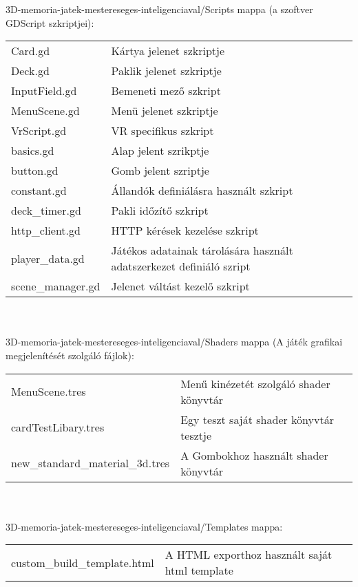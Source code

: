 \newpage

\noindent 3D-memoria-jatek-mestereseges-inteligenciaval/Scripts mappa (a szoftver GDScript szkriptjei):\\
\begin{tabular}{l l}
    \quad Card.gd  & \quad Kártya jelenet szkriptje \\ 
    \quad Deck.gd  & \quad Paklik jelenet szkriptje \\ 
    \quad InputField.gd  & \quad Bemeneti mező szkript \\ 
    \quad MenuScene.gd  & \quad Menü jelenet szkriptje \\ 
    \quad VrScript.gd  & \quad VR specifikus szkript \\ 
    \quad basics.gd  & \quad Alap jelent szrikptje \\ 
    \quad button.gd  & \quad Gomb jelent szriptje \\ 
    \quad constant.gd  & \quad Állandók definiálásra használt szkript \\ 
    \quad deck\_timer.gd  & \quad Pakli időzítő szkript \\ 
    \quad http\_client.gd  & \quad HTTP kérések kezelése szkript \\ 
    \quad player\_data.gd  & \quad Játékos adatainak tárolására használt adatszerkezet definiáló szript \\ 
    \quad scene\_manager.gd  & \quad Jelenet váltást kezelő szkript \\ 
\end{tabular}
\\\\
\noindent 3D-memoria-jatek-mestereseges-inteligenciaval/Shaders mappa (A játék grafikai megjelenítését szolgáló fájlok): \\
\begin{tabular}{l l}
    \quad MenuScene.tres  & \quad Menű kinézetét szolgáló shader könyvtár\\ 
    \quad cardTestLibary.tres  & \quad Egy teszt saját shader könyvtár tesztje \\ 
    \quad new\_standard\_material\_3d.tres  & \quad A Gombokhoz használt shader könyvtár \\     
\end{tabular}
\\\\
\noindent 3D-memoria-jatek-mestereseges-inteligenciaval/Templates mappa: \\
\begin{tabular}{l l}
    \quad custom\_build\_template.html  & \quad A HTML exporthoz használt saját html template\\ 
\end{tabular}
